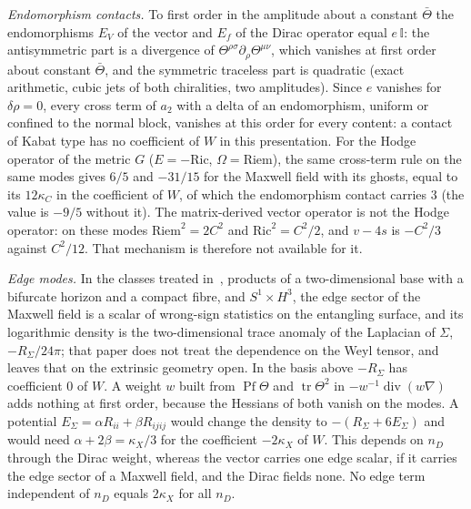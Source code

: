 \emph{Endomorphism contacts.} To first order in the amplitude about a constant \(\bar\Theta\) the endomorphisms \(E_V\) of the vector and \(E_f\) of the Dirac operator equal \(e\,\mathbb I\): the antisymmetric part is a divergence of \(\Theta^{\rho\sigma}\partial_\rho\Theta^{\mu\nu}\), which vanishes at first order about constant \(\bar\Theta\), and the symmetric traceless part is quadratic (exact arithmetic, cubic jets of both chiralities, two amplitudes). Since \(e\) vanishes for \(\delta\rho=0\), every cross term of \(a_2\) with a delta of an endomorphism, uniform or confined to the normal block, vanishes at this order for every content: a contact of Kabat type has no coefficient of \(W\) in this presentation. For the Hodge operator of the metric \(G\) (\(E=-\mathrm{Ric}\), \(\Omega=\mathrm{Riem}\)), the same cross-term rule on the same modes gives \(6/5\) and \(-31/15\) for the Maxwell field with its ghosts, equal to its \(12\kappa_C\) in the coefficient of \(W\), of which the endomorphism contact carries \(3\) (the value is \(-9/5\) without it). The matrix-derived vector operator is not the Hodge operator: on these modes \(\mathrm{Riem}^2=2C^2\) and \(\mathrm{Ric}^2=C^2/2\), and \(v-4s\) is \(-C^2/3\) against \(C^2/12\). That mechanism is therefore not available for it.



\emph{Edge modes.} In the classes treated in~\cite{DonnellyWall2016}, products of a two-dimensional base with a bifurcate horizon and a compact fibre, and \(S^1\times H^3\), the edge sector of the Maxwell field is a scalar of wrong-sign statistics on the entangling surface, and its logarithmic density is the two-dimensional trace anomaly of the Laplacian of \(\Sigma\), \(-R_\Sigma/24\pi\); that paper does not treat the dependence on the Weyl tensor, and leaves that on the extrinsic geometry open. In the basis above \(-R_\Sigma\) has coefficient \(0\) of \(W\). A weight \(w\) built from \(\operatorname{Pf}\Theta\) and \(\operatorname{tr}\Theta^2\) in \(-w^{-1}\operatorname{div}(w\nabla)\) adds nothing at first order, because the Hessians of both vanish on the modes. A potential \(E_\Sigma=\alpha R_{ii}+\beta R_{ijij}\) would change the density to \(-(R_\Sigma+6E_\Sigma)\) and would need \(\alpha+2\beta=\kappa_X/3\) for the coefficient \(-2\kappa_X\) of \(W\). This depends on \(n_D\) through the Dirac weight, whereas the vector carries one edge scalar, if it carries the edge sector of a Maxwell field, and the Dirac fields none. No edge term independent of \(n_D\) equals \(2\kappa_X\) for all \(n_D\).



